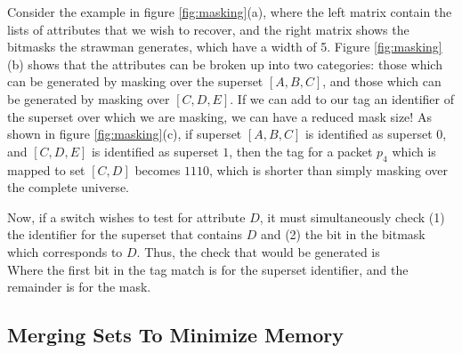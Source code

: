 Consider the example in figure \ref{fig:masking}(a), where the left matrix
contain the lists of attributes that we wish to recover, and the right matrix
shows the bitmasks the strawman generates, which have a width of 5. Figure
\ref{fig:masking}(b) shows that the attributes can be broken up into two
categories: those which can be generated by masking over the superset $[A,B,C]$,
and those which can be generated by masking over $[C,D,E]$. If we can add to our
tag an identifier of the superset over which we are masking, we can have a
reduced mask size! As shown in figure \ref{fig:masking}(c), if superset
$[A,B,C]$ is identified as superset $0$, and $[C,D,E]$ is identified as superset
$1$, then the tag for a packet $p_4$ which is mapped to set $[C,D]$ becomes
$1110$, which is shorter than simply masking over the complete universe.

Now, if a switch wishes to test for attribute $D$, it must simultaneously check
(1) the identifier for the superset that contains $D$ and (2) the bit in the
bitmask which corresponds to $D$. Thus, the check that would be generated is\\
Where the first bit in the tag match is for
the superset identifier, and the remainder is for the mask.



\subsection{Merging Sets To Minimize Memory}
\label{ssec:merge}





